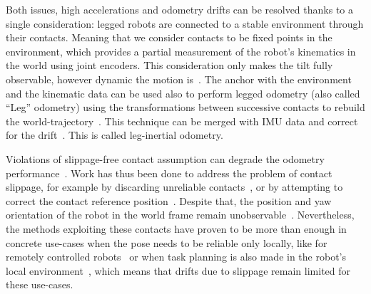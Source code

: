 \documentclass{IJCAS}
\begin{document}
Both issues, high accelerations and odometry drifts can be resolved thanks to a single consideration: legged robots are connected to a stable environment through their contacts. Meaning that we consider contacts to be fixed points in the environment, which provides a partial measurement of the robot's kinematics in the world using joint encoders. This consideration only makes the tilt fully observable, however dynamic the motion is~\cite{benallegue2020LyapunovStableOrientationEstimatorHumanoids}. The anchor with the environment and the kinematic data can be used also to perform legged odometry (also called ``Leg'' odometry) using the transformations between successive contacts to rebuild the world-trajectory~\cite{Lin2005ALegConfigurationMeasSystemHexapod}. This technique can be merged with IMU data and correct for the drift~\cite{bloesch2013FusionLegKineAndImu, masuya2015DeadReckoningAnchoringPivot}. This is called leg-inertial odometry.

 Violations of slippage-free contact assumption can degrade the odometry performance~\cite{lin2021legged, maravgakis2023probabilistic}. Work has thus been done to address the problem of contact slippage, for example by discarding unreliable contacts~\cite{lin2021legged, maravgakis2023probabilistic,yoon2023InvariantSmootherDynamicContactEventInformation}, or by attempting to correct the contact reference position~\cite{bloesch2013FusionLegKineAndImu,Hartley2020RIEKF, Demont2024KineticsObserver}. Despite that, the position and yaw orientation of the robot in the world frame remain unobservable~\cite{bloesch2013FusionLegKineAndImu}. Nevertheless, the methods exploiting these contacts have proven to be more than enough in concrete use-cases when the pose needs to be reliable only locally, like for remotely controlled robots~\cite{Grandia2024DesignControlBipedalRoboticCharacter} or when task planning is also made in the robot's local environment~\cite{Tsuru2023OnlineMulticontactReplanningHumanoid}, which means that drifts due to slippage remain limited for these use-cases.
\end{document}
